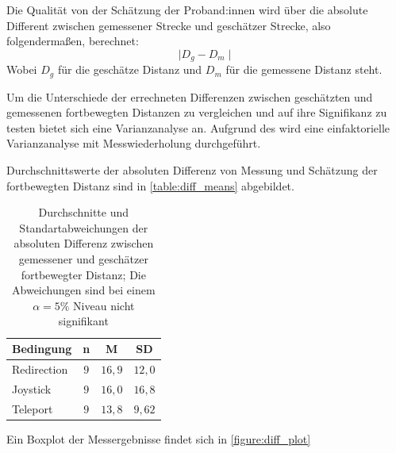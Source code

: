                     Die Qualität von der Schätzung der Proband:innen wird über die absolute Different zwischen gemessener Strecke und geschätzer Strecke, also folgendermaßen, berechnet:
                    $$ \mid D_g - D_m \mid $$
                    Wobei $D_g$ für die geschätze Distanz und $D_m$ für die gemessene Distanz steht.

                    Um die Unterschiede der errechneten Differenzen zwischen geschätzten und gemessenen fortbewegten Distanzen zu vergleichen und auf ihre Signifikanz zu testen bietet sich eine Varianzanalyse an.
                    Aufgrund des  wird eine einfaktorielle Varianzanalyse mit Messwiederholung durchgeführt.

                    Durchschnittswerte der absoluten Differenz von Messung und Schätzung der fortbewegten Distanz sind in \autoref{table:diff_means} abgebildet.

                    \begin{table}[!h]
                        \renewcommand\arraystretch{1.2}
                        \centering
                        \begin{tabular}{lccc} \toprule
                            Bedingung       & n & M    & SD   \\ \midrule
                            Redirection     & $9$ & $16,9$ & $12,0$ \\
                            Joystick        & $9$ & $16,0$ & $16,8$ \\
                            Teleport        & $9$ & $13,8$ & $9,62$ \\ \bottomrule
                        \end{tabular}
                        \caption{Durchschnitte und Standartabweichungen der absoluten Differenz zwischen gemessener und geschätzer fortbewegter Distanz; Die Abweichungen sind bei einem $\alpha = 5\%$ Niveau nicht signifikant}\label{table:diff_means}
                    \end{table}

                    Ein Boxplot der Messergebnisse findet sich in \autoref{figure:diff_plot}

